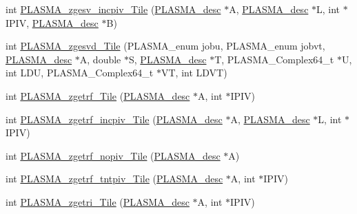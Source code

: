 \begin{DoxyCompactItemize}
\item 
int \hyperlink{group__PLASMA__Complex64__t__Tile_gab1992fd7d128b9101dfcf9da53238cec_gab1992fd7d128b9101dfcf9da53238cec}{P\+L\+A\+S\+M\+A\+\_\+zgesv\+\_\+incpiv\+\_\+\+Tile} (\hyperlink{structplasma__desc__t}{P\+L\+A\+S\+M\+A\+\_\+desc} $\ast$A, \hyperlink{structplasma__desc__t}{P\+L\+A\+S\+M\+A\+\_\+desc} $\ast$L, int $\ast$I\+P\+I\+V, \hyperlink{structplasma__desc__t}{P\+L\+A\+S\+M\+A\+\_\+desc} $\ast$B)
\item 
int \hyperlink{group__PLASMA__Complex64__t__Tile_ga1a980778f7600b387397b427443d1aa8_ga1a980778f7600b387397b427443d1aa8}{P\+L\+A\+S\+M\+A\+\_\+zgesvd\+\_\+\+Tile} (P\+L\+A\+S\+M\+A\+\_\+enum jobu, P\+L\+A\+S\+M\+A\+\_\+enum jobvt, \hyperlink{structplasma__desc__t}{P\+L\+A\+S\+M\+A\+\_\+desc} $\ast$A, double $\ast$S, \hyperlink{structplasma__desc__t}{P\+L\+A\+S\+M\+A\+\_\+desc} $\ast$T, P\+L\+A\+S\+M\+A\+\_\+\+Complex64\+\_\+t $\ast$U, int L\+D\+U, P\+L\+A\+S\+M\+A\+\_\+\+Complex64\+\_\+t $\ast$V\+T, int L\+D\+V\+T)
\item 
int \hyperlink{group__PLASMA__Complex64__t__Tile_gabaabd34550ca8a2ba83245af3c44bea0_gabaabd34550ca8a2ba83245af3c44bea0}{P\+L\+A\+S\+M\+A\+\_\+zgetrf\+\_\+\+Tile} (\hyperlink{structplasma__desc__t}{P\+L\+A\+S\+M\+A\+\_\+desc} $\ast$A, int $\ast$I\+P\+I\+V)
\item 
int \hyperlink{group__PLASMA__Complex64__t__Tile_ga767b9ff4ff1b5289e680ea42b05786e1_ga767b9ff4ff1b5289e680ea42b05786e1}{P\+L\+A\+S\+M\+A\+\_\+zgetrf\+\_\+incpiv\+\_\+\+Tile} (\hyperlink{structplasma__desc__t}{P\+L\+A\+S\+M\+A\+\_\+desc} $\ast$A, \hyperlink{structplasma__desc__t}{P\+L\+A\+S\+M\+A\+\_\+desc} $\ast$L, int $\ast$I\+P\+I\+V)
\item 
int \hyperlink{group__PLASMA__Complex64__t__Tile_ga721d9acb896bba35ed6d539b665164ff_ga721d9acb896bba35ed6d539b665164ff}{P\+L\+A\+S\+M\+A\+\_\+zgetrf\+\_\+nopiv\+\_\+\+Tile} (\hyperlink{structplasma__desc__t}{P\+L\+A\+S\+M\+A\+\_\+desc} $\ast$A)
\item 
int \hyperlink{group__PLASMA__Complex64__t__Tile_ga541593661d073c73cc922d06ba49f700_ga541593661d073c73cc922d06ba49f700}{P\+L\+A\+S\+M\+A\+\_\+zgetrf\+\_\+tntpiv\+\_\+\+Tile} (\hyperlink{structplasma__desc__t}{P\+L\+A\+S\+M\+A\+\_\+desc} $\ast$A, int $\ast$I\+P\+I\+V)
\item 
int \hyperlink{group__PLASMA__Complex64__t__Tile_ga7da186dd28a5bd5551d4c18ebb8e38ea_ga7da186dd28a5bd5551d4c18ebb8e38ea}{P\+L\+A\+S\+M\+A\+\_\+zgetri\+\_\+\+Tile} (\hyperlink{structplasma__desc__t}{P\+L\+A\+S\+M\+A\+\_\+desc} $\ast$A, int $\ast$I\+P\+I\+V)

\end{DoxyCompactItemize}
